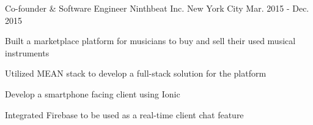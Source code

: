 \begin{cventries}
  \cventry
    {Co-founder \& Software Engineer} %
    {Ninthbeat Inc.} %
    {New York City} %
    {Mar. 2015 - Dec. 2015} %
    {
      \begin{cvitems} %
        \item {Built a marketplace platform for musicians to buy and sell their used musical instruments}
        \item {Utilized MEAN stack to develop a full-stack solution for the platform}
        \item {Develop a smartphone facing client using Ionic}
        \item {Integrated Firebase to be used as a real-time client chat feature}
      \end{cvitems}
    }

\end{cventries}
